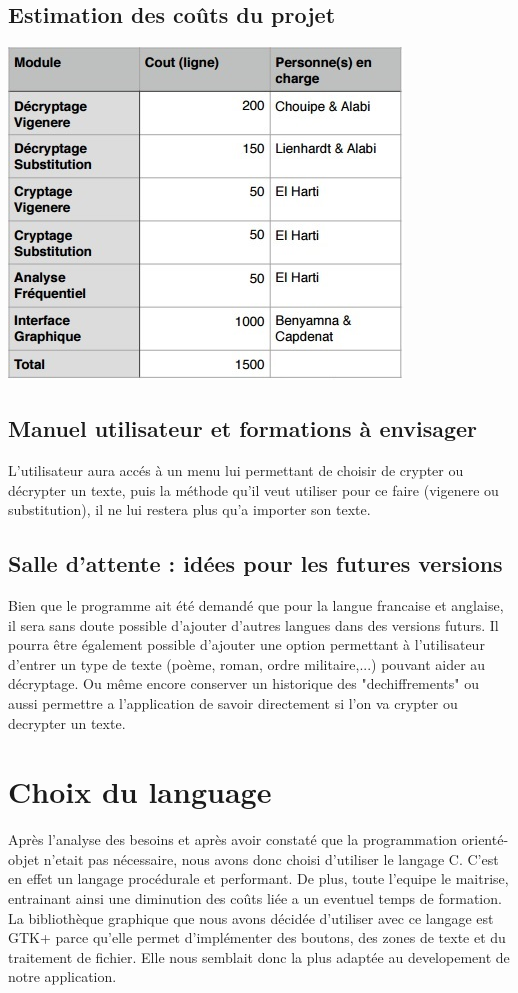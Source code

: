 \documentclass[a4]{article}
\begin{document}
		\subsection{Estimation des coûts du projet}
			\begin{center}\includegraphics[scale=0.5]{Tableau_cout.jpg}\end{center} 
		\subsection{Manuel utilisateur et formations à envisager}
			L'utilisateur aura accés à un menu lui permettant de choisir de crypter ou décrypter un 
			texte,
			puis la méthode qu'il veut utiliser pour ce faire (vigenere ou substitution), il ne lui 
			restera 
			plus qu'a importer son texte.
		\subsection{Salle d’attente : idées pour les futures versions}
			Bien que le programme ait été demandé que pour la langue francaise et anglaise, 
			il sera sans doute possible d'ajouter d'autres langues dans des versions futurs. 
			Il pourra être également possible d'ajouter une option permettant à l'utilisateur
			d'entrer un type de texte (poème, roman, ordre militaire,...) pouvant aider au décryptage.
			 Ou même encore conserver un historique des "dechiffrements" ou aussi permettre a 
			 l'application de savoir directement si l'on va crypter ou decrypter un texte.
		
	\section{Choix du language}
		Après l'analyse des besoins et après avoir constaté que la programmation 
		orienté-objet n'etait pas nécessaire, nous avons donc choisi d'utiliser le langage C.
		C'est en effet un langage procédurale et performant.
		De plus, toute l'equipe le maitrise, entrainant ainsi une diminution des coûts liée a
		un eventuel temps de formation.
		La bibliothèque graphique que nous avons décidée d'utiliser avec ce langage est GTK+ 
		parce qu'elle permet d'implémenter des boutons, des zones de texte et du traitement de fichier.
		Elle nous semblait donc la plus adaptée au developement de notre application.
	
\end{document}
